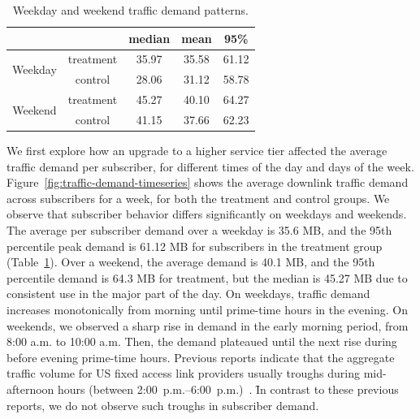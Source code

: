 \begin{table}[t]
\centering
\begin{tabular}{ cc | ccc }\\\hline
                         &           & median & mean  & 95\%  \\\hline
\multirow{2}{*}{Weekday} & treatment & 35.97  & 35.58 & 61.12 \\
                         & control   & 28.06  & 31.12 & 58.78 \\\hline
\multirow{2}{*}{Weekend} & treatment & 45.27  & 40.10 & 64.27 \\
                         & control   & 41.15  & 37.66 & 62.23 \\\hline
\end{tabular}
\caption{Weekday and weekend traffic demand patterns.}
\label{tab:traffic-demand-description}
\end{table}

We first explore how an upgrade to a higher service tier affected the
average traffic demand per subscriber, for different times of the day
and days of the week.  Figure~\ref{fig:traffic-demand-timeseries} shows
the average downlink traffic demand across subscribers for a week, for
both the treatment and control groups. We observe that subscriber
behavior differs significantly on weekdays and weekends.  The average
per subscriber demand over a weekday is 35.6 MB, and the 95th percentile
peak demand is 61.12 MB for subscribers in the treatment group
(Table~\ref{tab:traffic-demand-description}).  Over a weekend, the
average demand is 40.1 MB, and the 95th percentile demand is 64.3 MB for
treatment, but the median is 45.27 MB due to consistent use in the major
part of the day.  On weekdays, traffic demand increases monotonically
from morning until prime-time hours in the evening. On weekends, we
observed a sharp rise in demand in the early morning period, from 8:00
a.m. to 10:00 a.m. Then, the demand plateaued until the next rise
during before evening prime-time hours. Previous reports indicate that
the aggregate traffic volume for US fixed access link providers usually
troughs during mid-afternoon hours (between
2:00~p.m.--6:00~p.m.)~\cite{sandvine20141h}. \f{In contrast to these
  previous reports, we do not observe such troughs in 
subscriber demand.}

